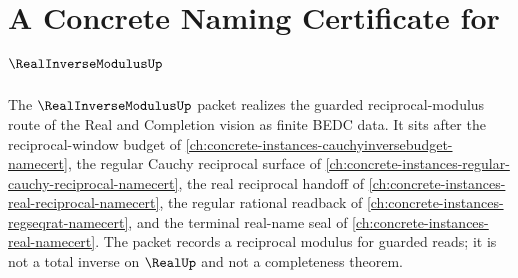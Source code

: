 \chapter{A Concrete Naming Certificate for $\RealInverseModulusUp$}
\label{ch:concrete-instances-real-inverse-modulus-namecert}

The $\RealInverseModulusUp$ packet realizes the guarded reciprocal-modulus route of the Real and Completion vision as finite BEDC data. It sits after the reciprocal-window budget of \autoref{ch:concrete-instances-cauchyinversebudget-namecert}, the regular Cauchy reciprocal surface of \autoref{ch:concrete-instances-regular-cauchy-reciprocal-namecert}, the real reciprocal handoff of \autoref{ch:concrete-instances-real-reciprocal-namecert}, the regular rational readback of \autoref{ch:concrete-instances-regseqrat-namecert}, and the terminal real-name seal of \autoref{ch:concrete-instances-real-namecert}. The packet records a reciprocal modulus for guarded reads; it is not a total inverse on $\RealUp$ and not a completeness theorem.


